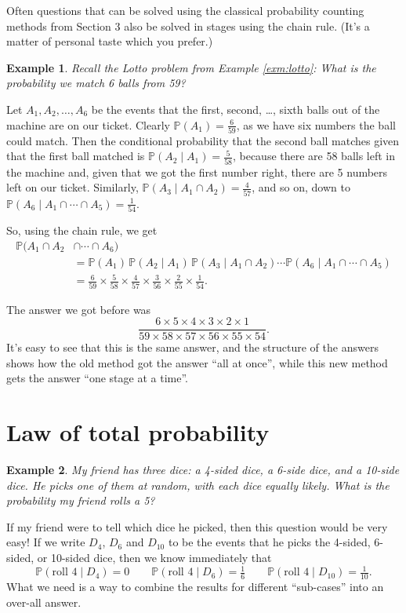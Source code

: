 \documentclass[
  a4paper,
]{book}
\theoremstyle{definition}
\theoremstyle{definition}
\newtheorem{example}{Example}[chapter]
\theoremstyle{definition}
\theoremstyle{definition}
\theoremstyle{remark}
\begin{document}
Often questions that can be solved using the classical probability counting methods from Section 3 also be solved in stages using the chain rule. (It's a matter of personal taste which you prefer.)

\begin{example}
\emph{Recall the Lotto problem from Example \ref{exm:lotto}: What is the probability we match 6 balls from 59?}

Let \(A_1, A_2, \dots, A_6\) be the events that the first, second, \ldots, sixth balls out of the machine are on our ticket. Clearly \(\mathbb P(A_1) = \frac{6}{59}\), as we have six numbers the ball could match. Then the conditional probability that the second ball matches given that the first ball matched is \(\mathbb P(A_2 \mid A_1) = \frac{5}{58}\), because there are 58 balls left in the machine and, given that we got the first number right, there are 5 numbers left on our ticket. Similarly, \(\mathbb P(A_3 \mid A_1 \cap A_2) = \frac{4}{57}\), and so on, down to \(\mathbb P(A_6 \mid A_1 \cap \cdots\cap A_5) = \frac{1}{54}\).

So, using the chain rule, we get
\begin{align*}
\mathbb P(A_1 \cap A_2 &\cap \cdots \cap A_6) \\
&= \mathbb P(A_1) \, \mathbb P(A_2 \mid A_1) \, \mathbb P(A_3 \mid A_1 \cap A_2) \cdots \mathbb P(A_6 \mid A_1 \cap \cdots \cap A_5) \\
&= \frac{6}{59} \times \frac{5}{58} \times \frac{4}{57} \times \frac{3}{56} \times \frac{2}{55} \times \frac{1}{54} .
\end{align*}

The answer we got before was
\[ \frac{6 \times 5 \times 4 \times 3 \times 2 \times 1}{59 \times 58 \times 57 \times 56 \times 55 \times 54} . \]
It's easy to see that this is the same answer, and the structure of the answers shows how the old method got the answer ``all at once'', while this new method gets the answer ``one stage at a time''.
\end{example}

\hypertarget{total-prob}{%
\section{Law of total probability}\label{total-prob}}

\begin{example}
\emph{My friend has three dice: a 4-sided dice, a 6-side dice, and a 10-side dice. He picks one of them at random, with each dice equally likely. What is the probability my friend rolls a 5?}

If my friend were to tell which dice he picked, then this question would be very easy! If we write \(D_4\), \(D_6\) and \(D_{10}\) to be the events that he picks the 4-sided, 6-sided, or 10-sided dice, then we know immediately that
\[ \mathbb P(\text{roll 4} \mid D_4) = 0 \qquad \mathbb P(\text{roll 4} \mid D_6) = \tfrac16 \qquad \mathbb P(\text{roll 4} \mid D_{10}) = \tfrac{1}{10} .  \]
What we need is a way to combine the results for different ``sub-cases'' into an over-all answer.
\end{example}
\end{document}
